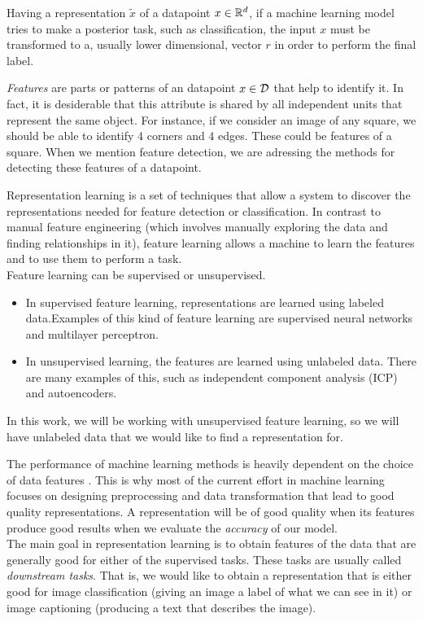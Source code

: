 Having a representation $\tilde{x}$ of a datapoint $x\in \mathbb{R}^d$, if a machine learning model
tries to make a posterior task, such as classification, the input $x$ must be transformed to a, usually lower dimensional, vector $r$ in order to perform the final label.

\emph{Features} are parts or patterns of an datapoint $x \in \mathcal{D}$ that help to identify it. In fact, it is desiderable that this attribute is shared by all independent units that represent the same object. For instance, if we consider an image of any square, we should be able to identify 4 corners and 4 edges. These could be features of a square.
When we mention feature detection, we are adressing the methods for detecting these features of a datapoint.

Representation learning is a set of techniques that allow a system to discover the representations needed for feature detection or classification. 
In contrast to manual feature engineering (which involves manually exploring the data and finding relationships in it), feature learning allows a machine to learn the features and to use them to perform a task.\\

Feature learning can be supervised or unsupervised. 
\begin{itemize}
    \item In supervised feature learning, representations are learned using labeled data.Examples of this kind of feature learning are supervised neural networks and multilayer perceptron. 
    \item In unsupervised learning, the features are learned using unlabeled data. There are many examples of this, such as independent component analysis (ICP) and autoencoders.
\end{itemize}
 In this work, we will be working with unsupervised feature learning, so we will have unlabeled data that we would like to find a representation for.


The performance of machine learning methods is heavily dependent on the choice of data features \citep{bengio_representation_2014}. This is why most of the current 
effort in machine learning focuses on designing preprocessing and data transformation that lead to good quality representations. A representation will be of good quality when its features
produce good results when we evaluate the \emph{accuracy} of our model.\\

The main goal in representation learning is to obtain features of the data that are generally good for either of the supervised tasks. These tasks are usually called \emph{downstream tasks}. That is, we would like to obtain
a representation that is either good for image classification (giving an image a label of what we can see in it) or image captioning (producing a text that describes the image).

